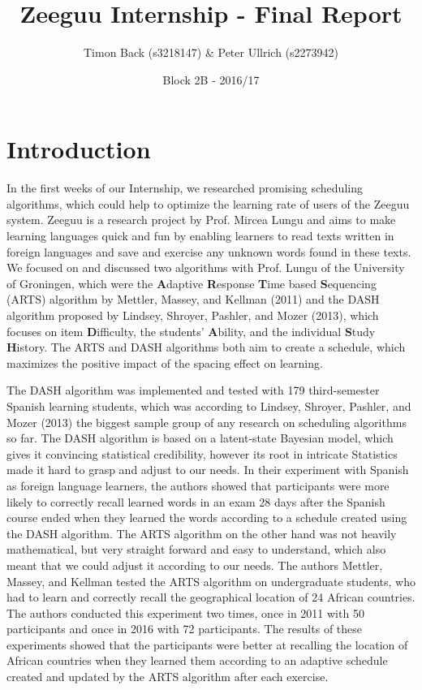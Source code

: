 \documentclass{article}
\title{Zeeguu Internship - Final Report}
\author{Timon Back (s3218147) \& Peter Ullrich (s2273942)}
\date{Block 2B - 2016/17}
\begin{document}
\maketitle

\section{Introduction}
In the first weeks of our Internship, we researched promising scheduling algorithms, which could help to optimize the learning rate of users of the Zeeguu system. Zeeguu is a research project by Prof. Mircea Lungu and aims to make learning languages quick and fun by enabling learners to read texts written in foreign languages and save and exercise any unknown words found in these texts. We focused on and discussed two algorithms with Prof. Lungu of the University of Groningen, which were the \textbf{A}daptive \textbf{R}esponse \textbf{T}ime based \textbf{S}equencing (ARTS) algorithm by Mettler, Massey, and Kellman (2011) and the DASH algorithm proposed by Lindsey, Shroyer, Pashler, and Mozer (2013)\cite{mettler2014adaptive}, which focuses on item \textbf{D}ifficulty, the students’ \textbf{A}bility, and the individual \textbf{S}tudy \textbf{H}istory. The ARTS and DASH algorithms both aim to create a schedule, which maximizes the positive impact of the spacing effect\cite{bahrick1993maintenance} on learning.

The DASH algorithm was implemented and tested with 179 third-semester Spanish learning students, which was according to Lindsey, Shroyer, Pashler, and Mozer (2013) the biggest sample group of any research on scheduling algorithms so far. The DASH algorithm is based on a latent-state Bayesian model, which gives it convincing statistical credibility, however its root in intricate Statistics made it hard to grasp and adjust to our needs. In their experiment with Spanish as foreign language learners, the authors showed that participants were more likely to correctly recall learned words in an exam 28 days after the Spanish course ended when they learned the words according to a schedule created using the DASH algorithm. 
The ARTS algorithm on the other hand was not heavily mathematical, but very straight forward and easy to understand, which also meant that we could adjust it according to our needs. The authors Mettler, Massey, and Kellman tested the ARTS algorithm on undergraduate students, who had to learn and correctly recall the geographical location of 24 African countries. The authors conducted this experiment two times, once in 2011 with 50 participants and once in 2016 with 72 participants. The results of these experiments showed that the participants were better at recalling the location of African countries when they learned them according to an adaptive schedule created and updated by the ARTS algorithm after each exercise. 
\end{document}
